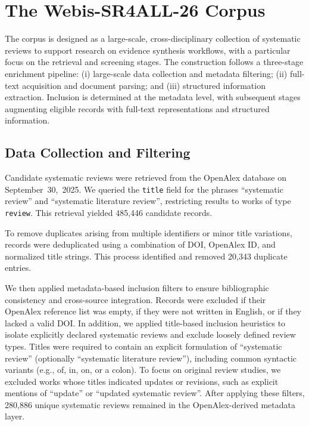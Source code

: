 \section{The Webis-SR4ALL-26 Corpus}

The corpus is designed as a large-scale, cross-disciplinary collection of systematic reviews to support research on evidence synthesis workflows, with a particular focus on the retrieval and screening stages. The construction follows a three-stage enrichment pipeline: (i) large-scale data collection and metadata filtering; (ii) full-text acquisition and document parsing; and (iii) structured information extraction. Inclusion is determined at the metadata level, with subsequent stages augmenting eligible records with full-text representations and structured information. 

\subsection{Data Collection and Filtering}
Candidate systematic reviews were retrieved from the OpenAlex database on September~30,~2025. We queried the \texttt{title} field for the phrases ``systematic review'' and ``systematic literature review'', restricting results to works of type \texttt{review}. This retrieval yielded 485,446 candidate records.

To remove duplicates arising from multiple identifiers or minor title variations, records were deduplicated using a combination of DOI, OpenAlex ID, and normalized title strings. This process identified and removed 20,343 duplicate entries.

We then applied metadata-based inclusion filters to ensure bibliographic consistency and cross-source integration. Records were excluded if their OpenAlex reference list was empty, if they were not written in English, or if they lacked a valid DOI. In addition, we applied title-based inclusion heuristics to isolate explicitly declared systematic reviews and exclude loosely defined review types. Titles were required to contain an explicit formulation of ``systematic review'' (optionally ``systematic literature review''), including common syntactic variants (e.g., of, in, on, or a colon). To focus on original review studies, we excluded works whose titles indicated updates or revisions, such as explicit mentions of ``update'' or ``updated systematic review''. After applying these filters, 280,886 unique systematic reviews remained in the OpenAlex-derived metadata layer.

